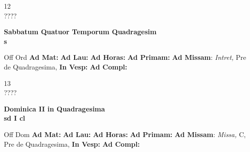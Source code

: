 \documentclass[10pt, openany]{book}
\begin{document}
    \begin{center}
        \begin{minipage}{3.5in}
            \vspace{2em}
            \begin{minipage}{0.5in}
                {\Huge 12} \\
                {\normalsize ????}
            \end{minipage}
            \begin{minipage}{3.0in}
                \textbf{ \large Sabbatum Quatuor Temporum Quadragesim \\
                \textnormal{\normalsize s}}

            \end{minipage}
            \begin{justify}Off Ord
                \textbf{Ad Mat: }
                \textbf{Ad Lau: }
                \textbf{Ad Horas: }
                \textbf{Ad Primam: }\textbf{Ad Missam}: \textit{Intret,} Pre de Quadragesima, 
                \textbf{In Vesp: }
                \textbf{Ad Compl: }
            \end{justify}
        \end{minipage}
    \end{center}

    \begin{center}
        \begin{minipage}{3.5in}
            \vspace{2em}
            \begin{minipage}{0.5in}
                {\Huge 13} \\
                {\normalsize ????}
            \end{minipage}
            \begin{minipage}{3.0in}
                \textbf{ \large Dominica II in Quadragesima \\
                \textnormal{\normalsize sd I cl}}

            \end{minipage}
            \begin{justify}Off Dom
                \textbf{Ad Mat: }
                \textbf{Ad Lau: }
                \textbf{Ad Horas: }
                \textbf{Ad Primam: }\textbf{Ad Missam}: \textit{Missa,} C, Pre de Quadragesima, 
                \textbf{In Vesp: }
                \textbf{Ad Compl: }
            \end{justify}
        \end{minipage}
    \end{center}
\end{document}
